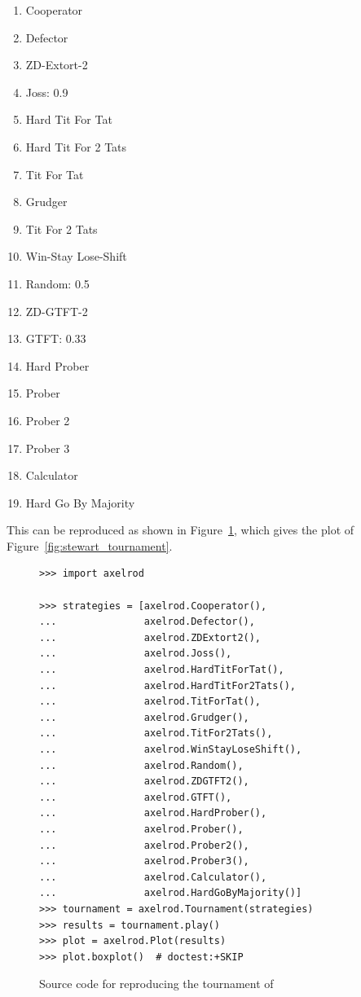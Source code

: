 \documentclass{article}
\begin{document}
\begin{enumerate}
    \item Cooperator
    \item Defector
    \item ZD-Extort-2
    \item Joss: 0.9
    \item Hard Tit For Tat
    \item Hard Tit For 2 Tats
    \item Tit For Tat
    \item Grudger
    \item Tit For 2 Tats
    \item Win-Stay Lose-Shift
    \item Random: 0.5
    \item ZD-GTFT-2
    \item GTFT: 0.33
    \item Hard Prober
    \item Prober
    \item Prober 2
    \item Prober 3
    \item Calculator
    \item Hard Go By Majority
\end{enumerate}

This can be reproduced as shown in Figure~\ref{fig:stewart-code}, which gives
the plot of Figure~\ref{fig:stewart_tournament}.

\begin{figure}[!hbtp]
    \begin{verbatim}
>>> import axelrod

>>> strategies = [axelrod.Cooperator(),
...               axelrod.Defector(),
...               axelrod.ZDExtort2(),
...               axelrod.Joss(),
...               axelrod.HardTitForTat(),
...               axelrod.HardTitFor2Tats(),
...               axelrod.TitForTat(),
...               axelrod.Grudger(),
...               axelrod.TitFor2Tats(),
...               axelrod.WinStayLoseShift(),
...               axelrod.Random(),
...               axelrod.ZDGTFT2(),
...               axelrod.GTFT(),
...               axelrod.HardProber(),
...               axelrod.Prober(),
...               axelrod.Prober2(),
...               axelrod.Prober3(),
...               axelrod.Calculator(),
...               axelrod.HardGoByMajority()]
>>> tournament = axelrod.Tournament(strategies)
>>> results = tournament.play()
>>> plot = axelrod.Plot(results)
>>> plot.boxplot()  # doctest:+SKIP
    \end{verbatim}
    \caption{Source code for reproducing the tournament of \cite{Stewart2012}}
    \label{fig:stewart-code}
\end{figure}
\end{document}
